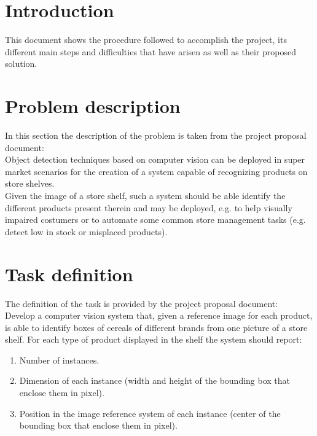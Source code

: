 \documentclass[12pt]{article}
\begin{document}
\section{Introduction}

This document shows the procedure followed to accomplish the project, its different main steps and difficulties that have arisen as well as their proposed solution.

\section{Problem description}

In this section the description of the problem is taken from the project proposal document:\\

Object detection techniques based on computer vision can be deployed in super market scenarios for the creation of a system capable of recognizing products on store shelves.\\

Given the image of a store shelf, such a system should be able identify the different products present therein and may be deployed, e.g. to help visually impaired costumers or to automate some common store management tasks (e.g. detect low in stock or misplaced products).

\section{Task definition}

The definition of the task is provided by the project proposal document:\\

Develop a computer vision system that, given a reference image for each product, is able to identify boxes of cereals of different brands from one picture of a store shelf. For each type of product displayed in the shelf the system should report:

\begin{enumerate}
	\item Number of instances.
	\item Dimension of each instance (width and height of the bounding box that enclose them in pixel).
	\item Position in the image reference system of each instance (center of the bounding box that enclose them in pixel).
\end{enumerate}
\end{document}
